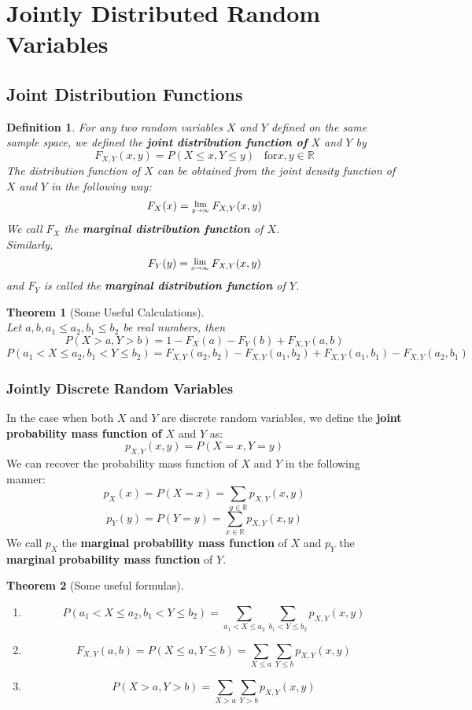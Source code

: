 \documentclass[12pt]{article}
\newcommand{\Lim}[1]{\raisebox{0.5ex}{\scalebox{0.8}{$\displaystyle \lim_{#1}\;$}}}
\newtheorem{definition}{Definition}[section]
\newtheorem{theorem}{Theorem}[section]
\theoremstyle{definition}
\begin{document}
\section{Jointly Distributed Random Variables}
\subsection{Joint Distribution Functions}
\begin{definition}\normalfont For any two random variables $X$ and $Y$ defined on the same sample space, we defined the \textbf{joint distribution function of }$X$ and $Y$ by
\[
F_{X,Y}(x,y)=P(X\leq x,Y\leq y)\;\;\;\text{for} x,y\in\mathbb{R}
\]
The distribution function of $X$ can be obtained from the joint density function of $X$ and $Y$ in the following way:
\[
F_X(x)=\Lim{y\to\infty}F_{X,Y}(x,y)
\]
We call $F_X$ the \textbf{marginal distribution function} of $X$.\\
Similarly,
\[
F_Y(y)=\Lim{x\to\infty}F_{X,Y}(x,y)
\]
and $F_Y$ is called the \textbf{marginal distribution function} of $Y$.
\end{definition}
\begin{theorem}[Some Useful Calculations]
\hfill\\\normalfont
Let $a,b,a_1\leq a_2, b_1\leq b_2$ be real numbers, then
\[
P(X>a, Y>b) = 1-F_X(a)-F_Y(b)+F_{X,Y}(a,b)
\]
\[
P(a_1<X\leq a_2, b_1<Y\leq b_2)=F_{X,Y}(a_2,b_2)-F_{X,Y}(a_1,b_2)+F_{X,Y}(a_1,b_1)-F_{X,Y}(a_2,b_1)
\]
\end{theorem}
\subsubsection{Jointly Discrete Random Variables}
In the case when both $X$ and $Y$ are discrete random variables, we define the \textbf{joint probability mass function of }$X$ and $Y$ as:
\[
p_{X,Y}(x,y)=P(X=x,Y=y)
\]
We can recover the probability mass function of $X$ and $Y$ in the following manner:
\[
p_X(x)=P(X=x)=\sum_{y\in\mathbb{R}}p_{X,Y}(x,y)
\]
\[
p_Y(y)=P(Y=y)=\sum_{x\in\mathbb{R}}p_{X,Y}(x,y)
\]
We call $p_X$ the \textbf{marginal probability mass function} of $X$ and $p_Y$ the \textbf{marginal probability mass function} of $Y$.
\begin{theorem}[Some useful formulas]
\hfill\\\normalfont
\begin{enumerate}
\item
\[
P(a_1<X\leq a_2,b_1<Y\leq b_2) = \sum_{a_1<X\leq a_2}\sum_{b_1<Y\leq b_2}p_{X,Y}(x,y)
\]
\item
\[
F_{X,Y}(a,b) = P(X\leq a, Y\leq b)=\sum_{X\leq a}\sum_{Y\leq b}p_{X,Y}(x,y)
\]
\item
\[
P(X>a, Y>b) = \sum_{X> a}\sum_{Y> b}p_{X,Y}(x,y)
\]
\end{enumerate}
\end{theorem}
\end{document}
